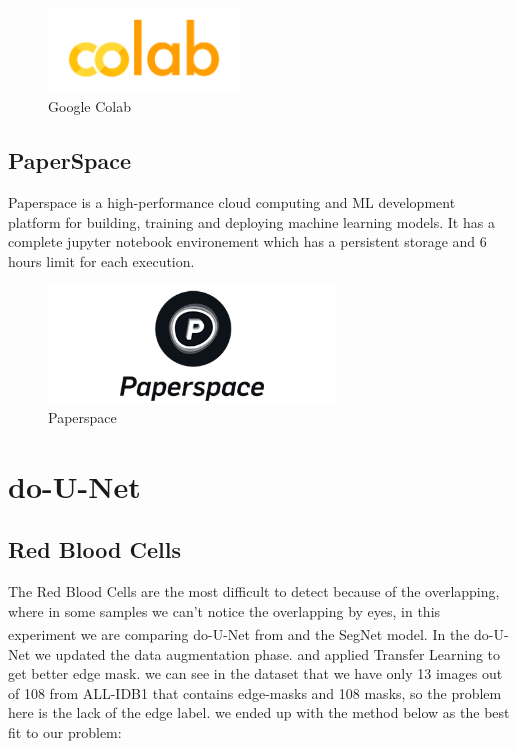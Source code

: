\begin{figure}[H]
\centering
  \vspace{-0.1in}
    \centerline{\includegraphics[width = 2in]{../images/colab.png}}
    \caption{Google Colab}
    \label{Google Colab}
\end{figure}

\subsection{PaperSpace}
Paperspace is a high-performance cloud computing and ML development platform for building, training and deploying machine learning models. It has a complete jupyter notebook environement which has a persistent storage and 6 hours limit for each execution.

\begin{figure}[H]
    \centering
      \vspace{-0.1in}
        \centerline{\includegraphics[width = 3in]{../images/paperspace.png}}
        \caption{Paperspace}
        \label{Paperspace}
    \end{figure}

\section{do-U-Net}

\subsection{Red Blood Cells}
The Red Blood Cells are the most difficult to detect because of the overlapping, where in some samples we can't notice the overlapping by eyes, in this experiment we are comparing do-U-Net from \textsuperscript{\cite{10.1007/978-3-030-44584-3_31}} and the SegNet model.
In the do-U-Net we updated the data augmentation phase. and applied Transfer Learning to get better edge mask. we can see in the dataset that we have only 13 images out of 108 from ALL-IDB1 that contains edge-masks and 108 masks, so the problem here is the lack of the edge label. we ended up with the method below as the best fit to our problem:

